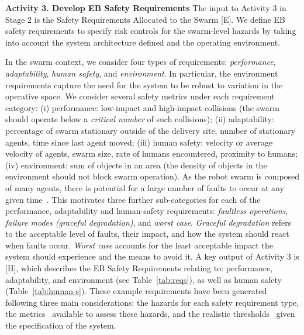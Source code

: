 \documentclass{article}
\begin{document}
\noindent\textbf{Activity 3. Develop EB Safety Requirements} The input to Activity 3 in Stage 2 is the Safety Requirements Allocated to the Swarm [E]. 
We define EB safety requirements to specify risk controls for the swarm-level hazards by taking into account the system architecture defined and the operating environment. 

In the swarm context, we consider four types of requirements: \emph{performance}, \emph{adaptability}, \emph{human safety}, and \emph{environment}. 
In particular, the environment requirements capture the need for the system to be robust to variation in the operative space.
We consider several safety metrics under each requirement category: 
(i) performance: low-impact and high-impact collisions (the swarm should operate below a \emph{critical number} of such collisions); 
(ii) adaptability: percentage of swarm stationary outside of the delivery site, number of stationary agents, time since last agent moved; 
(iii) human safety: velocity or average velocity of agents, swarm size, rate of humans encountered, proximity to humans;
(iv) environment: sum of objects in an area (the density of objects in the environment should not block swarm operation).
As the robot swarm is composed of many agents, there is potential for a large number of faults to occur at any given time~\cite{Lee2022}. This motivates three further sub-categories for each of the performance, adaptability and human-safety requirements: \emph{faultless operations}, \emph{failure modes (graceful degradation)}, and \emph{worst case}. 
\emph{Graceful degradation} refers to the acceptable level of faults, their impact, and how the system should react when faults occur. \emph{Worst case} accounts for the least acceptable impact the system should experience and the means to avoid it. 
A key output of Activity 3 is [H], which describes the EB Safety Requirements relating to: performance, adaptability, and environment (see Table~\ref{tab:reqs}), as well as human safety (Table~\ref{tab:human-s}). 
These example requirements have been generated following three main considerations: the hazards for each safety requirement type, the metrics~\cite{Lee2022} available to assess these hazards, and the realistic thresholds~\cite{Jones2022} given the specification of the system.
\end{document}
